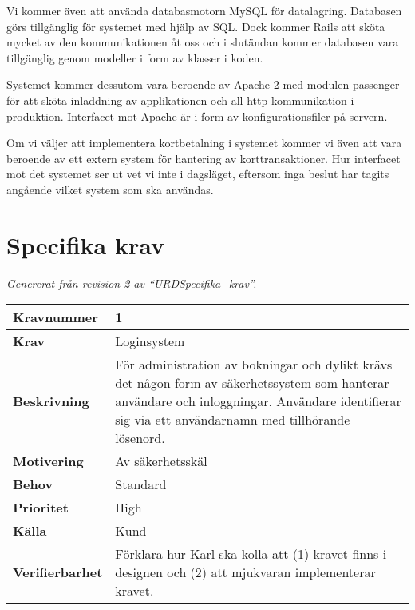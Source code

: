 \documentclass[a4paper, twoside, 11pt, titlepage]{article}
\begin{document}
	Vi kommer även att använda databasmotorn MySQL för datalagring. Databasen görs tillgänglig för systemet med hjälp av SQL. Dock kommer Rails att sköta mycket av den kommunikationen åt oss och i slutändan kommer databasen vara tillgänglig genom modeller i form av klasser i koden. 

	Systemet kommer dessutom vara beroende av Apache 2 med modulen passenger för att sköta inladdning av applikationen och all http-kommunikation i produktion. Interfacet mot Apache är i form av konfigurationsfiler på servern. 

	Om vi väljer att implementera kortbetalning i systemet kommer vi även att vara beroende av ett extern system för hantering av korttransaktioner. Hur interfacet mot det systemet ser ut vet vi inte i dagsläget, eftersom inga beslut har tagits angående vilket system som ska användas.

\clearpage
	\section{Specifika krav}


\emph{Genererat från revision 2 av ``URDSpecifika\_krav''.}

\begin{tabular} { | p{3cm} | p{12.2cm} | }
	\hline
	\textbf{Kravnummer} & 1  \\
	\hline
	\textbf{Krav} & Loginsystem  \\
	\hline
	\textbf{Beskrivning} & För administration av bokningar och dylikt krävs det någon form av säkerhetssystem som hanterar användare och inloggningar. Användare identifierar sig via ett användarnamn med tillhörande lösenord.  \\
	\hline
	\textbf{Motivering} & Av säkerhetsskäl  \\
	\hline
	\textbf{Behov} & Standard  \\
	\hline
	\textbf{Prioritet} & High  \\
	\hline
	\textbf{Källa} & Kund  \\
	\hline
	\textbf{Verifierbarhet} & Förklara hur Karl ska kolla att (1) kravet finns i designen och (2) att mjukvaran implementerar kravet.  \\
	\hline
\end{tabular}
\end{document}
